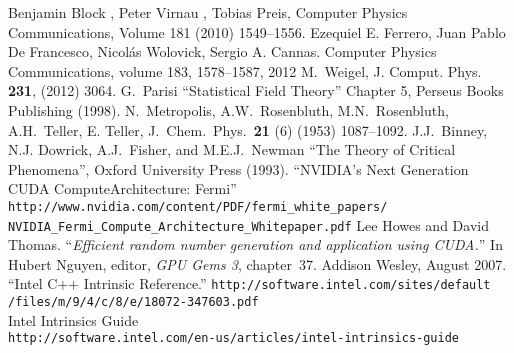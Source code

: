 \documentclass[a4paper]{llncs}
\begin{document}
\begin{thebibliography}{9}
Benjamin Block , Peter Virnau , Tobias Preis, Computer Physics Communications, Volume 181 (2010) 1549–1556.
Ezequiel E. Ferrero, Juan Pablo De Francesco, Nicolás Wolovick, Sergio A. Cannas. Computer Physics Communications, volume 183, 1578--1587, 2012
 M.~Weigel, J. Comput. Phys. \textbf{231},  (2012) 3064.
 G.~Parisi ``Statistical Field Theory'' Chapter 5, Perseus Books Publishing (1998).
N.~Metropolis, A.W.~Rosenbluth, M.N.~Rosenbluth, A.H.~Teller, E. Teller,
   J.~Chem.~Phys.~\textbf{21} (6) (1953) 1087--1092.
J.J.~Binney, N.J. Dowrick, A.J.~Fisher, and M.E.J.~Newman ``The Theory of Critical Phenomena'', Oxford University Press (1993).
``NVIDIA's Next Generation CUDA ComputeArchitecture: Fermi'' \\
\verb!http://www.nvidia.com/content/PDF/fermi_white_papers/!\\
\verb!NVIDIA_Fermi_Compute_Architecture_Whitepaper.pdf!
Lee Howes and David Thomas.
``{\em Efficient random number generation and application using {CUDA}.}''
In Hubert Nguyen, editor, {\em GPU Gems 3}, chapter~37. Addison
  Wesley, August 2007.
 ``Intel C++ Intrinsic Reference.'' 
\verb!http://software.intel.com/sites/default!\\\verb!/files/m/9/4/c/8/e/18072-347603.pdf! \\
Intel Intrinsics Guide\\ \verb!http://software.intel.com/en-us/articles/intel-intrinsics-guide!

\end{thebibliography}
\end{document}
